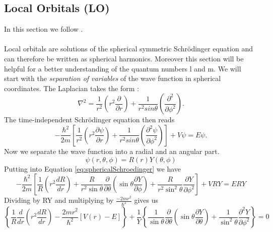 		\subsection{Local Orbitals (LO)} 
			In this section we follow \cite{DJG01}. \\\\
			Local orbitals are solutions of the spherical symmetric Schrödinger equation and can therefore be written as spherical harmonics. Moreover this section will be helpful for a better understanding of the quantum numbers l and m. We will start with the \textit{separation of variables} of the wave function in spherical coordinates. The Laplacian takes the form :
			\begin{equation}
				\nabla^2 = \frac{1}{r^2} \left(r^2 \frac{\partial}{\partial r}\right) + \frac{1}{r^2 sin \theta} \left(\frac{\partial^2}{\partial \phi^2} \right).
			\end{equation}
			The time-independent Schrödinger equation then reads 
			\begin{equation}
				\label{eq:sphericalSchroedinger}
				-\frac{\hbar^2}{2m} \left[ \frac{1}{r^2} \left(r^2 \frac{\partial \psi}{\partial r}\right) + \frac{1}{r^2 sin \theta} \left(\frac{\partial^2 \psi}{\partial \phi^2} \right) \right] + V \psi = E \psi.
			\end{equation}
			Now we separate the wave function into a radial and an angular part.
			\begin{equation}
				\psi (r, \theta, \phi) = R(r) Y(\theta, \phi)
			\end{equation}
			Putting into Equation \ref{eq:sphericalSchroedinger} we have
			\begin{equation}
				-\frac{\hbar^2}{2m} \left[ \frac{1}{R} \left( r^2 \frac{d R}{d r}  \right) + \frac{R}{r^2 \sin \theta} \frac{\partial}{\partial \theta} \left( \sin \theta \frac{\partial Y}{\partial \phi} \right) + \frac{R}{r^2 \sin^2 \theta} \frac{\partial Y}{\partial \phi^2} \right] + VRY  = ERY	
			\end{equation}
			Dividing by RY and multiplying by $\frac{-2mr^2}{\hbar^2}$ gives us 			
			\begin{equation}
				\label{eq:schrödingerSeparated}
				\left\{ \frac{1}{R} \frac{d}{d r} \left(r^2 \frac{d R}{dr} \right) - \frac{2mr^2}{\hbar^2}[V(r) - E] \right\} + \frac{1}{Y} \left\{ \frac{1}{\sin \theta} \frac{\partial}{\partial \theta} \left( \sin \theta \frac{\partial Y}{\partial \theta} \right) + \frac{1}{\sin^2 \theta} \frac{\partial^2 Y}{\partial \phi^2} \right\} = 0
			\end{equation}
